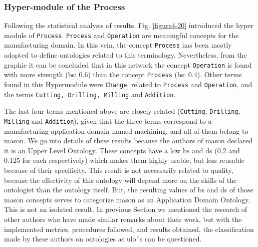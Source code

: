 \subsubsection{Hyper-module of the Process}\label{subsubsection4.2.5.3}

Following the statistical   analysis of results, Fig. \ref{figure4-20} introduced the hyper module of \texttt{Process}. \texttt{Process} and \texttt{Operation} are meaningful concepts for the manufacturing domain. In this vein, the concept \texttt{Process} has been mostly adopted to define ontologies related to this terminology. Nevertheless, from the graphic it can be concluded that in this network the concept \texttt{Operation} is found with more strength   (\gls{bs}: 0.6) than the concept \texttt{Process} (\gls{bs}: 0.4). Other terms found in this Hypermodule were \texttt{Change}, related to \texttt{Process} and \texttt{Operation}, and the terms \texttt{Cutting, Drilling, Milling} and \texttt{Addition}. 

The last four terms mentioned above are closely related (\texttt{Cutting}, \texttt{Drilling}, \texttt{Milling} and \texttt{Addition}), given that   the three terms correspond to a manufacturing application domain named machining, and all of them belong to \gls{mason}. We go into details of these results because the authors of \gls{mason} declared it is an Upper Level Ontology. These concepts have a low \gls{bs} and \gls{ds} (0.2 and 0.125 for each respectively) which makes them highly usable, but less reusable because of their specificity. This result is not necessarily related to quality, because the effectivity of this ontology will depend more on the skills of the ontologist than the ontology itself. But, the resulting values of \gls{bs} and \gls{ds} of those \gls{mason} concepts serves  to categorize \gls{mason} as an Application Domain Ontology. This is not an isolated result. In previous Section we  mentioned the research of other authors who have made similar remarks about their work, but with the implemented metrics,  procedures followed, and results obtained, the classification made by these authors  on  ontologies as \gls{ulo}´s can be questioned. 



